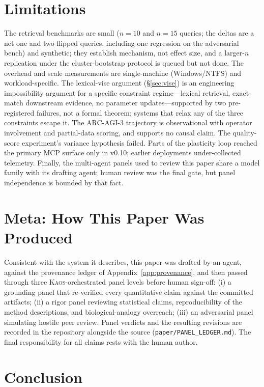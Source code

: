 \documentclass[11pt]{article}
\newcommand{\kaos}{\textsc{Kaos}}
\begin{document}
\section{Limitations}
\label{sec:limits}

The retrieval benchmarks are small ($n{=}10$ and $n{=}15$ queries; the deltas are a net one and two flipped queries, including one regression on the adversarial bench) and synthetic; they establish mechanism, not effect size, and a larger-$n$ replication under the cluster-bootstrap protocol is queued but not done. The overhead and scale measurements are single-machine (Windows/NTFS) and workload-specific. The lexical-vise argument (\S\ref{sec:vise}) is an engineering impossibility argument for a specific constraint regime---lexical retrieval, exact-match downstream evidence, no parameter updates---supported by two pre-registered failures, not a formal theorem; systems that relax any of the three constraints escape it. The ARC-AGI-3 trajectory is observational with operator involvement and partial-data scoring, and supports no causal claim. The quality-score experiment's variance hypothesis failed. Parts of the plasticity loop reached the primary MCP surface only in v0.10; earlier deployments under-collected telemetry. Finally, the multi-agent panels used to review this paper share a model family with its drafting agent; human review was the final gate, but panel independence is bounded by that fact.

\section{Meta: How This Paper Was Produced}
\label{sec:meta}

Consistent with the system it describes, this paper was drafted by an agent, against the provenance ledger of Appendix~\ref{app:provenance}, and then passed through three \kaos{}-orchestrated panel levels before human sign-off: (i) a grounding panel that re-verified every quantitative claim against the committed artifacts; (ii) a rigor panel reviewing statistical claims, reproducibility of the method descriptions, and biological-analogy overreach; (iii) an adversarial panel simulating hostile peer review. Panel verdicts and the resulting revisions are recorded in the repository alongside the source (\texttt{paper/PANEL\_LEDGER.md}). The final responsibility for all claims rests with the human author.

\section{Conclusion}
\end{document}
